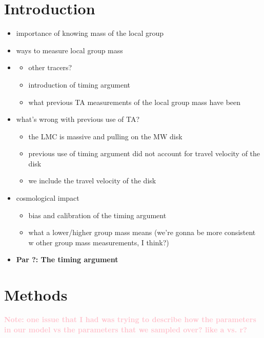 \documentclass[twocolumn]{aastex631}
\newcommand{\kc}[1]{\textcolor{pink}{\textbf{#1}} }
\begin{document}
\section{Introduction}
\label{sec:intro}

\begin{itemize}
    \item importance of knowing mass of the local group
    \item ways to measure local group mass
    \item \begin{itemize}
            \item other tracers? 
            \item introduction of timing argument 
            \item what previous TA measurements of the local group mass have been
          \end{itemize}
    \item what's wrong with previous use of TA?
        \begin{itemize}
            \item the LMC is massive and pulling on the MW disk
            \item previous use of timing argument did not account for travel velocity of the disk
            \item we include the travel velocity of the disk
        \end{itemize}
    \item cosmological impact
        \begin{itemize}
            \item bias and calibration of the timing argument 
            \item what a lower/higher group mass means (we're gonna be more consistent w other group mass measurements, I think?)
        \end{itemize}
    \item\textbf{Par ?: The timing argument }
    
\end{itemize}

\section{Methods}\label{sec:methods}
\kc{Note: one issue that I had was trying to describe how the parameters in our model vs the parameters that we sampled over? like a vs. r? }
\end{document}
